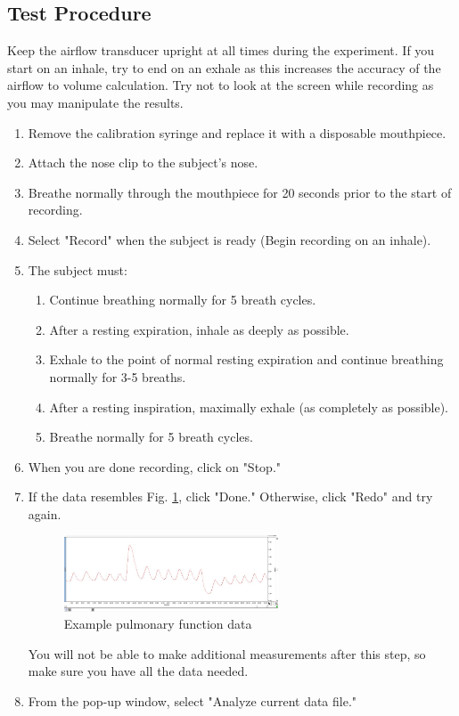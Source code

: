 \documentclass{article}
\begin{document}
\subsection*{Test Procedure}
\begin{info}
	Keep the airflow transducer upright at all times during the experiment. If you start on an inhale, try to end on an exhale as this increases the accuracy of the airflow to volume calculation. Try not to look at the screen while recording as you may manipulate the results.
\end{info}
\begin{enumerate}
	\item Remove the calibration syringe and replace it with a disposable mouthpiece.
	\item Attach the nose clip to the subject's nose.
	\item Breathe normally through the mouthpiece for 20 seconds prior to the start of recording.
	\item Select "Record" when the subject is ready (Begin recording on an inhale).
	\item The subject must:\begin{enumerate}
		\item Continue breathing normally for 5 breath cycles.
		\item After a resting expiration, inhale as deeply as possible.
		\item Exhale to the point of normal resting expiration and continue breathing normally for 3-5 breaths.
		\item After a resting inspiration, maximally exhale (as completely as possible).
		\item Breathe normally for 5 breath cycles.
	\end{enumerate}
	
	\item When you are done recording, click on "Stop."
	\item If the data resembles Fig. \ref{example}, click "Done." Otherwise, click "Redo" and try again.
	
		\begin{figure}[h]
	\centering\includegraphics[width=0.6\textwidth]{../images/PF_I_6.jpg}
		\caption{Example pulmonary function data}
		\label{example}
		\end{figure}
	
	\begin{info}
		You will not be able to make additional measurements after this step, so make sure you have all the data needed.
	\end{info}
	\item From the pop-up window, select "Analyze current data file."
\end{enumerate}
\end{document}
